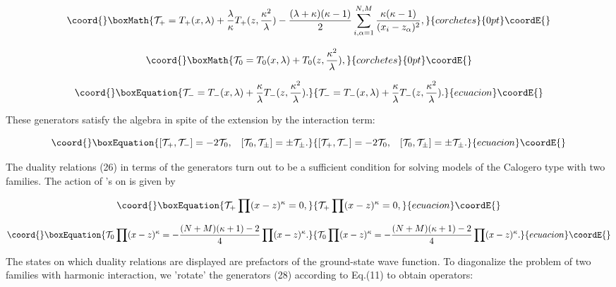 \documentclass[a4paper,preprint,aps]{revtex4}
\begin{document}
\[\coord{}\boxMath{	
	{\cal T_{+}}=
	T_{+}(x,\lambda)+\frac{\lambda}{\kappa}T_{+}(z,\frac{\kappa^{2}}
	{\lambda})-\frac{(\lambda+\kappa)(\kappa-1)}{2}\sum_{i,\alpha=1}^{N,M}
	\frac{\kappa(\kappa-1)}{(x_{i}-z_{\alpha})^{2}},
}{corchetes}{0pt}\coordE{}\]

\[\coord{}\boxMath{ 
	{\cal T_{\rm 0}}=
	T_{0}(x,\lambda)+T_{0}(z,\frac{\kappa^{2}}{\lambda}),
}{corchetes}{0pt}\coordE{}\]

\begin{equation}\coord{}\boxEquation{
	{\cal T_{-}}=T_{-}(x,\lambda)+
	\frac{\kappa}{\lambda}T_{-}(z,\frac{\kappa^{2}}{\lambda}) .
}{
	{\cal T_{-}}=T_{-}(x,\lambda)+
	\frac{\kappa}{\lambda}T_{-}(z,\frac{\kappa^{2}}{\lambda}) .
}{ecuacion}\coordE{}\end{equation}

These generators satisfy the \coordHE{} algebra in spite of the extension by the
 interaction term:

  
\begin{equation}\coord{}\boxEquation{
	[{\cal T}_{+},{\cal T_{-}}]=-2 {\cal T}_{0},\;\;\;
	[{\cal T}_{0},{\cal T}_{\pm}]=\pm {\cal T}_{\pm}.
}{
	[{\cal T}_{+},{\cal T_{-}}]=-2 {\cal T}_{0},\;\;\;
	[{\cal T}_{0},{\cal T}_{\pm}]=\pm {\cal T}_{\pm}.
}{ecuacion}\coordE{}\end{equation}

 The duality relations (26) in terms of the generators \coordHE{}
 turn out to be a sufficient condition for solving models of the Calogero type
 with two families. The action of \coordHE{}'s on \coordHE{} is
 given by


\begin{equation}\coord{}\boxEquation{
	{\cal T_{+}}\prod (x-z)^{\kappa}=0 ,
}{
	{\cal T_{+}}\prod (x-z)^{\kappa}=0 ,
}{ecuacion}\coordE{}\end{equation}

\begin{equation}\coord{}\boxEquation{
	{\cal T_{\rm 0}}\prod (x-z)^{\kappa}=-\frac{(N+M)(\kappa+1)-2}{4}
	\prod (x-z)^{\kappa} .
}{
	{\cal T_{\rm 0}}\prod (x-z)^{\kappa}=-\frac{(N+M)(\kappa+1)-2}{4}
	\prod (x-z)^{\kappa} .
}{ecuacion}\coordE{}\end{equation}

The states on which duality relations are displayed are prefactors of the
 ground-state wave function. To diagonalize the problem of two families with
 harmonic interaction, we 'rotate' the generators (28) according to Eq.(11)
 to obtain \coordHE{} operators:
\end{document}
